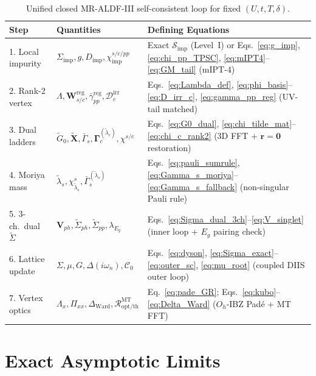 \documentclass[11pt,a4paper]{article}
\numberwithin{equation}{section}
\theoremstyle{plain}
\theoremstyle{definition}
\begin{document}
\begin{table}[htbp]
\centering
\renewcommand{\arraystretch}{1.22}
\caption{Unified closed MR-ALDF-III self-consistent loop for fixed $(U, t, T, \delta)$.}
\label{tab:closed_system}
\vspace{0.4em}
\small
\begin{tabular}{p{2.7cm}p{4.3cm}p{7.4cm}}
\hline\hline
\textbf{Step} & \textbf{Quantities} & \textbf{Defining Equations} \\
\hline
1. Local impurity & $\Sigma_{\mathrm{imp}}, g, D_{\mathrm{imp}}, \chi_{\mathrm{imp}}^{s/c/pp}$
    & Exact $\mathcal{S}_{\mathrm{imp}}$ (Level~I) or Eqs.~\eqref{eq:g_imp}, \eqref{eq:chi_pp_TPSC}, \eqref{eq:mIPT4}--\eqref{eq:GM_tail} (mIPT-4) \\
2. Rank-2 vertex & $\Lambda, \mathbf{W}_{s/c}^{\mathrm{reg}}, \bar{\gamma}_{pp}^{\mathrm{reg}}, \mathcal{D}_c^{\mathrm{irr}}$
    & Eqs.~\eqref{eq:Lambda_def}, \eqref{eq:phi_basis}--\eqref{eq:D_irr_c}, \eqref{eq:gamma_pp_reg} (UV-tail matched) \\
3. Dual ladders & $\tilde{G}_0, \tilde{\mathbf{X}}, \bar{\Gamma}_s, \mathbf{\Gamma}_c^{(\tilde{\lambda}_c)}, \chi^{s/c}$
    & Eqs.~\eqref{eq:G0_dual}, \eqref{eq:chi_tilde_mat}--\eqref{eq:chi_c_rank2} (3D FFT + $\mathbf{r}=\mathbf{0}$ restoration) \\
4. Moriya mass & $\tilde{\lambda}_s, \chi^s_{\tilde{\lambda}_s}, \bar{\Gamma}_s^{(\tilde{\lambda}_s)}$
    & Eqs.~\eqref{eq:pauli_sumrule}, \eqref{eq:Gamma_s_moriya}--\eqref{eq:Gamma_s_fallback} (non-singular Pauli rule) \\
5. 3-ch.\ dual $\tilde{\Sigma}$ & $\mathbf{V}_{ph}, \tilde{\Sigma}_{ph}, \tilde{\Sigma}_{pp}, \lambda_{E_g}$
    & Eqs.~\eqref{eq:Sigma_dual_3ch}--\eqref{eq:V_singlet} (inner loop + $E_g$ pairing check) \\
6. Lattice update & $\Sigma, \mu, G, \Delta(i\omega_n), \mathcal{C}_0$
    & Eqs.~\eqref{eq:dyson}, \eqref{eq:Sigma_exact}--\eqref{eq:outer_sc}, \eqref{eq:mu_root} (coupled DIIS outer loop) \\
7. Vertex optics & $\Lambda_x, \Pi_{xx}, \Delta_{\mathrm{Ward}}, \mathcal{R}_{\mathrm{opt/th}}^{\mathrm{MT}}$
    & Eq.~\eqref{eq:pade_GR}; Eqs.~\eqref{eq:kubo}--\eqref{eq:Delta_Ward} ($O_h$-IBZ Pad\'e + MT FFT) \\
\hline\hline
\end{tabular}
\end{table}

\section{Exact Asymptotic Limits}
\label{sec:limits}
\end{document}

